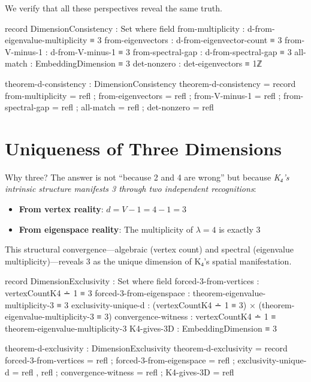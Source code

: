\documentclass[11pt,a4paper]{book}
\begin{document}
We verify that all these perspectives reveal the same truth.

\begin{code}
record DimensionConsistency : Set where
  field
    from-multiplicity   : d-from-eigenvalue-multiplicity ≡ 3
    from-eigenvectors   : d-from-eigenvector-count ≡ 3
    from-V-minus-1      : d-from-V-minus-1 ≡ 3
    from-spectral-gap   : d-from-spectral-gap ≡ 3
    all-match           : EmbeddingDimension ≡ 3
    det-nonzero         : det-eigenvectors ≡ 1ℤ

theorem-d-consistency : DimensionConsistency
theorem-d-consistency = record
  { from-multiplicity   = refl
  ; from-eigenvectors   = refl
  ; from-V-minus-1      = refl
  ; from-spectral-gap   = refl
  ; all-match           = refl
  ; det-nonzero         = refl
  }
\end{code}

\section{Uniqueness of Three Dimensions}

Why three? The answer is not ``because 2 and 4 are wrong'' but because \emph{K₄'s intrinsic structure manifests 3 through two independent recognitions}:
\begin{itemize}
\item \textbf{From vertex reality}: $d = V - 1 = 4 - 1 = 3$
\item \textbf{From eigenspace reality}: The multiplicity of $\lambda = 4$ is exactly 3
\end{itemize}
This structural convergence—algebraic (vertex count) and spectral (eigenvalue multiplicity)—reveals 3 as the unique dimension of K₄'s spatial manifestation.

\begin{code}
record DimensionExclusivity : Set where
  field
    forced-3-from-vertices   : vertexCountK4 ∸ 1 ≡ 3
    forced-3-from-eigenspace : theorem-eigenvalue-multiplicity-3 ≡ 3
    exclusivity-unique-d     : (vertexCountK4 ∸ 1 ≡ 3) × (theorem-eigenvalue-multiplicity-3 ≡ 3)
    convergence-witness      : vertexCountK4 ∸ 1 ≡ theorem-eigenvalue-multiplicity-3
    K4-gives-3D              : EmbeddingDimension ≡ 3

theorem-d-exclusivity : DimensionExclusivity
theorem-d-exclusivity = record
  { forced-3-from-vertices = refl
  ; forced-3-from-eigenspace = refl
  ; exclusivity-unique-d = refl , refl
  ; convergence-witness = refl
  ; K4-gives-3D  = refl
  }
\end{code}
\end{document}
